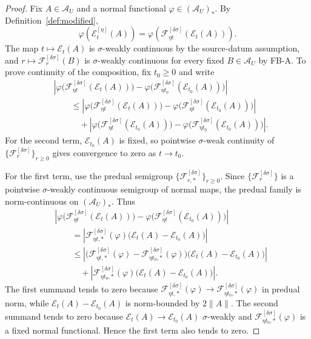 \documentclass[12pt]{article}
\theoremstyle{definition}
\theoremstyle{remark}
\begin{document}
\begin{proof}
Fix \(A\in\mathcal A_U\) and a normal functional
\(\varphi\in(\mathcal A_U)_*\). By Definition~\ref{def:modified},
\[
\varphi(\mathcal E_t^{[\eta]}(A))
=
\varphi\!\left(
\mathscr F_{\eta t}^{[\delta\sigma]}(\mathcal E_t(A))
\right).
\]
The map \(t\mapsto \mathcal E_t(A)\) is \(\sigma\)-weakly continuous by
the source-datum assumption, and
\(r\mapsto \mathscr F_r^{[\delta\sigma]}(B)\) is
\(\sigma\)-weakly continuous for every fixed \(B\in\mathcal A_U\) by
FB-A. To prove continuity of the composition, fix \(t_0\ge0\) and write
\begin{align*}
&\left|
\varphi\bigl(\mathscr F_{\eta t}^{[\delta\sigma]}(\mathcal E_t(A))\bigr)
-
\varphi\bigl(\mathscr F_{\eta t_0}^{[\delta\sigma]}(\mathcal E_{t_0}(A))\bigr)
\right| \\
&\qquad \le
\left|
\varphi\bigl(\mathscr F_{\eta t}^{[\delta\sigma]}(\mathcal E_t(A))\bigr)
-
\varphi\bigl(\mathscr F_{\eta t}^{[\delta\sigma]}(\mathcal E_{t_0}(A))\bigr)
\right| \\
&\qquad\quad +
\left|
\varphi\bigl(\mathscr F_{\eta t}^{[\delta\sigma]}(\mathcal E_{t_0}(A))\bigr)
-
\varphi\bigl(\mathscr F_{\eta t_0}^{[\delta\sigma]}(\mathcal E_{t_0}(A))\bigr)
\right|.
\end{align*}
For the second term, \(\mathcal E_{t_0}(A)\) is fixed, so pointwise
\(\sigma\)-weak continuity of
\(\{\mathscr F_r^{[\delta\sigma]}\}_{r\ge0}\) gives convergence to
zero as \(t\to t_0\).

For the first term, use the predual semigroup
\(\{\mathscr F_{r,*}^{[\delta\sigma]}\}_{r\ge0}\). Since
\(\{\mathscr F_r^{[\delta\sigma]}\}\) is a pointwise
\(\sigma\)-weakly continuous semigroup of normal maps, the predual
family is norm-continuous on \((\mathcal A_U)_*\). Thus
\begin{align*}
&\left|
\varphi\bigl(\mathscr F_{\eta t}^{[\delta\sigma]}(\mathcal E_t(A))\bigr)
-
\varphi\bigl(\mathscr F_{\eta t}^{[\delta\sigma]}(\mathcal E_{t_0}(A))\bigr)
\right| \\
&\qquad =
\left|
\mathscr F_{\eta t,*}^{[\delta\sigma]}(\varphi)
\bigl(\mathcal E_t(A)-\mathcal E_{t_0}(A)\bigr)
\right| \\
&\qquad \le
\left|
\bigl(\mathscr F_{\eta t,*}^{[\delta\sigma]}(\varphi)
-
\mathscr F_{\eta t_0,*}^{[\delta\sigma]}(\varphi)\bigr)
\bigl(\mathcal E_t(A)-\mathcal E_{t_0}(A)\bigr)
\right| \\
&\qquad\quad +
\left|
\mathscr F_{\eta t_0,*}^{[\delta\sigma]}(\varphi)
\bigl(\mathcal E_t(A)-\mathcal E_{t_0}(A)\bigr)
\right|.
\end{align*}
The first summand tends to zero because
\(\mathscr F_{\eta t,*}^{[\delta\sigma]}(\varphi)\to
\mathscr F_{\eta t_0,*}^{[\delta\sigma]}(\varphi)\) in predual norm,
while \(\mathcal E_t(A)-\mathcal E_{t_0}(A)\) is norm-bounded by
\(2\|A\|\). The second summand tends to zero because
\(\mathcal E_t(A)\to\mathcal E_{t_0}(A)\) \(\sigma\)-weakly and
\(\mathscr F_{\eta t_0,*}^{[\delta\sigma]}(\varphi)\) is a fixed normal
functional. Hence the first term also tends to zero.


\end{proof}
\end{document}
